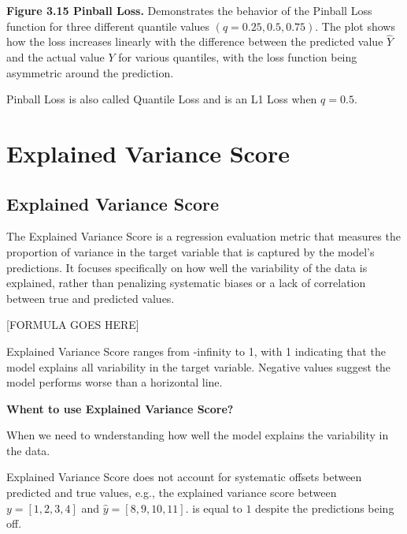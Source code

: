 \textbf{Figure 3.15 Pinball Loss.} Demonstrates the behavior of the Pinball Loss function for three different quantile values $(q = 0.25, 0.5, 0.75)$.
The plot shows how the loss increases linearly with the difference between the predicted value $\hat{Y}$ and the actual value $Y$ for various quantiles, with the loss function being asymmetric around the prediction.

{Pinball Loss is also called Quantile Loss and is an L1 Loss when $q=0.5$.}

\clearpage
\thispagestyle{regressionstyle}
\section{Explained Variance Score}
\subsection{Explained Variance Score}

The Explained Variance Score is a regression evaluation metric that measures the proportion of variance in the target variable that is captured by the model’s predictions.
It focuses specifically on how well the variability of the data is explained, rather than penalizing systematic biases or a lack of correlation between true and predicted values.

\begin{center}
    [FORMULA GOES HERE]
\end{center}

Explained Variance Score ranges from -infinity to 1, with 1 indicating that the model explains all variability in the target variable. Negative values suggest the model performs worse
than a horizontal line.

\textbf{Whent to use Explained Variance Score?}

When we need to wnderstanding how well the model explains the variability in the data.

{
    \item Explained Variance Score does not account for systematic offsets between predicted and true values, e.g., the explained variance score between 
    \( y=[1, 2, 3, 4] \) and \( \hat{y}=[8, 9, 10, 11] \). is equal to $1$ despite the predictions being off.
}
